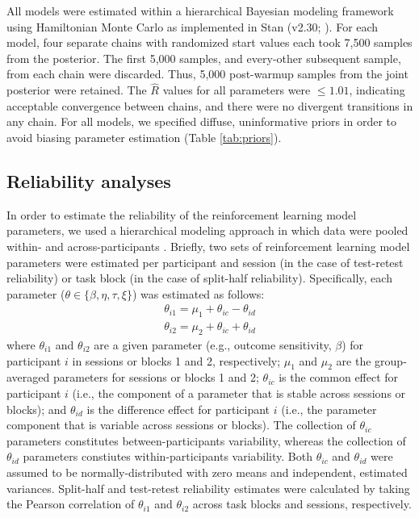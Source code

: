 \documentclass[a4paper,12pt]{article}
\begin{document}
\begin{refsection}[supp]
All models were estimated within a hierarchical Bayesian modeling framework using Hamiltonian Monte Carlo as implemented in Stan (v2.30; \cite{carpenter2017stan}). For each model, four separate chains with randomized start values each took 7,500 samples from the posterior. The first 5,000 samples, and every-other subsequent sample, from each chain were discarded. Thus, 5,000 post-warmup samples from the joint posterior were retained. The $\hat{R}$ values for all parameters were $\leq 1.01$, indicating acceptable convergence between chains, and there were no divergent transitions in any chain. For all models, we specified diffuse, uninformative priors in order to avoid biasing parameter estimation (Table \ref{tab:priors}).

\subsection*{Reliability analyses}

In order to estimate the reliability of the reinforcement learning model parameters, we used a hierarchical modeling approach in which data were pooled within- and across-participants \cite{rouder2019psychometrics}. Briefly, two sets of reinforcement learning model parameters were estimated per participant and session (in the case of test-retest reliability) or task block (in the case of split-half reliability). Specifically, each parameter ($\theta \in \{\beta, \eta, \tau, \xi \}$) was estimated as follows:
\begin{equation}
\begin{split}
    \theta_{i1} = \mu_1 + \theta_{ic} - \theta_{id} \\
    \theta_{i2} = \mu_2 + \theta_{ic} + \theta_{id}
\end{split}
\end{equation}
where $\theta_{i1}$ and $\theta_{i2}$ are a given parameter (e.g., outcome sensitivity, $\beta$) for participant $i$ in sessions or blocks 1 and 2, respectively; $\mu_1$ and $\mu_2$ are the group-averaged parameters for sessions or blocks 1 and 2; $\theta_{ic}$ is the common effect for participant $i$ (i.e., the component of a parameter that is stable across sessions or blocks); and $\theta_{id}$ is the difference effect for participant $i$ (i.e., the parameter component that is variable across sessions or blocks). The collection of $\theta_{ic}$ parameters constitutes between-participants variability, whereas the collection of $\theta_{id}$ parameters constiutes within-participants variability. Both $\theta_{ic}$ and $\theta_{id}$ were assumed to be normally-distributed with zero means and independent, estimated variances. Split-half and test-retest reliability estimates were calculated by taking the Pearson correlation of $\theta_{i1}$ and $\theta_{i2}$ across task blocks and sessions, respectively.


\end{refsection}
\end{document}
